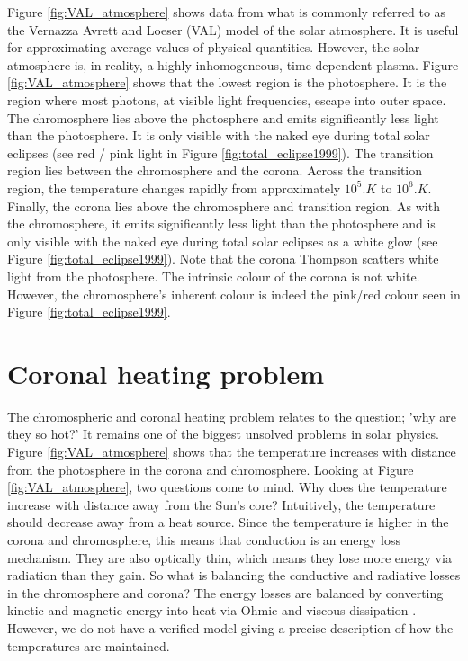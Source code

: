 Figure \ref{fig:VAL_atmosphere} shows data from what is commonly referred to as the Vernazza Avrett and Loeser (VAL) \citep{Vernazza1981} model of the solar atmosphere. It is useful for approximating average values of physical quantities. However, the solar atmosphere is, in reality, a highly inhomogeneous, time-dependent plasma. Figure \ref{fig:VAL_atmosphere} shows that the lowest region is the photosphere. It is the region where most photons, at visible light frequencies, escape into outer space. The chromosphere lies above the photosphere and emits significantly less light than the photosphere. It is only visible with the naked eye during total solar eclipses (see red / pink light in Figure \ref{fig:total_eclipse1999}). The transition region lies between the chromosphere and the corona. Across the transition region, the temperature changes rapidly from approximately $10^5\si{.K}$ to $10^6\si{.K}$. Finally, the corona lies above the chromosphere and transition region. As with the chromosphere, it emits significantly less light than the photosphere and is only visible with the naked eye during total solar eclipses as a white glow (see Figure \ref{fig:total_eclipse1999}). Note that the corona Thompson scatters white light from the photosphere. The intrinsic colour of the corona is not white. However, the chromosphere's inherent colour is indeed the pink/red colour seen in Figure \ref{fig:total_eclipse1999}.

\section{Coronal heating problem}
\label{sec:coronal_heating_problem}

The chromospheric and coronal heating problem relates to the question; 'why are they so hot?' It remains one of the biggest unsolved problems in solar physics. Figure \ref{fig:VAL_atmosphere} shows that the temperature increases with distance from the photosphere in the corona and chromosphere. Looking at Figure \ref{fig:VAL_atmosphere}, two questions come to mind. Why does the temperature increase with distance away from the Sun's core? Intuitively, the temperature should decrease away from a heat source. Since the temperature is higher in the corona and chromosphere, this means that conduction is an energy loss mechanism. They are also optically thin, which means they lose more energy via radiation than they gain. So what is balancing the conductive and radiative losses in the chromosphere and corona?
The energy losses are balanced by converting kinetic and magnetic energy into heat via Ohmic and viscous dissipation \citep{Klimchuk2015}. However, we do not have a verified model giving a precise description of how the temperatures are maintained.

